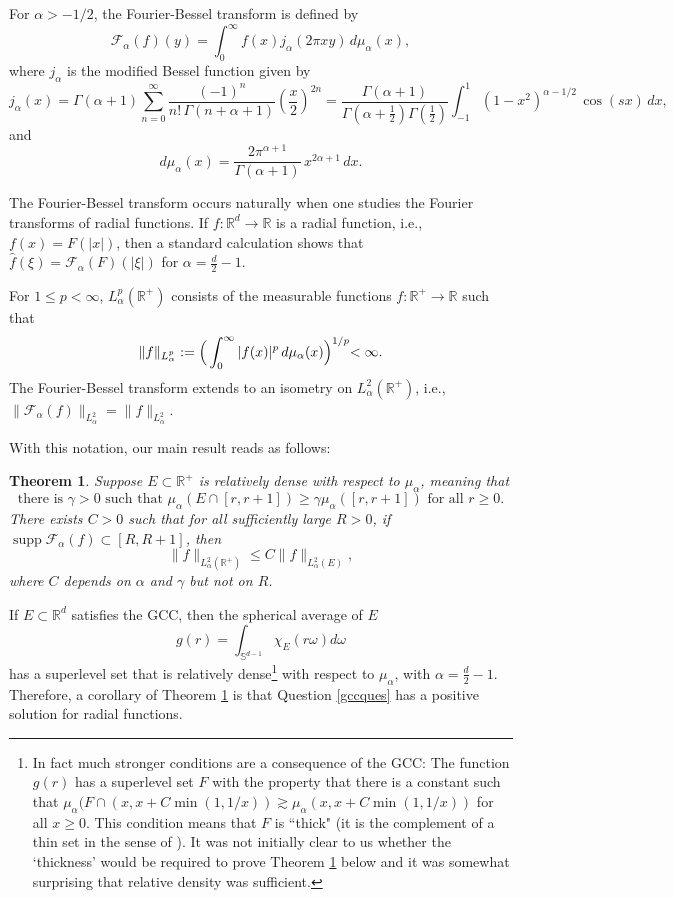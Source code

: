 \documentclass[11pt,a4paper,reqno,dvipsnames]{amsart}
\newcommand{\supp}{\operatorname{supp}}
\newcommand{\F}{\mathcal{F}}
\newcommand{\R}{\mathbb R}
\renewcommand{\ge}{\geqslant}
\renewcommand{\le}{\leqslant}
\numberwithin{equation}{section}
\theoremstyle{plain}
\newtheorem{theorem}[equation]{Theorem}
\theoremstyle{definition}
\theoremstyle{remark}
\begin{document}
For $\alpha > -1/2$, the Fourier-Bessel transform is defined by $$\mathcal F_\alpha(f)(y) = \int_0^\infty f(x) j_\alpha(2\pi xy)\, d\mu_\alpha(x),$$
      where $j_\alpha$ is the modified Bessel function given by $$j_\alpha(x) = \Gamma(\alpha + 1) \sum_{n=0}^\infty \frac{(-1)^n}{n!\, \Gamma(n + \alpha + 1)} \left(\frac{x}{2}\right)^{2n} = \frac{\Gamma(\alpha + 1)}{\Gamma\left(\alpha + \frac12\right) \Gamma\left(\frac12\right)} \int_{-1}^1 (1-x^2)^{\alpha - 1/2}\, \cos(sx)\, dx,$$
      and
      $$d\mu_\alpha(x) = \frac{2\pi^{\alpha + 1}}{\Gamma(\alpha + 1)}\, x^{2\alpha+1}\, dx.$$

The Fourier-Bessel transform occurs naturally when one studies the Fourier transforms of radial functions. If $f: \R^d \to \R$ is a radial function, i.e., $f(x) = F(|x|)$, then a standard calculation shows that $\widehat{f}(\xi) = \F_\alpha (F)(|\xi|)$ for $\alpha = \frac{d}{2} - 1$.
      
      For $1\leqslant p < \infty$, $L^p_\alpha(\R^+)$ consists of the measurable functions $f:\R^+ \to \R$ such that
      $$\|f\|_{L^p_\alpha} := \Bigl(\,\int_0^\infty |f(x)|^p\, d\mu_\alpha(x) \Bigl)^{1/p}<\infty.$$
      The Fourier-Bessel transform extends to an isometry on $L^2_\alpha(\R^+)$, i.e., $\|\mathcal{F}_\alpha(f)\|_{L^2_\alpha} = \|f\|_{L^2_\alpha}$.

With this notation, our main result reads as follows:

      \begin{tcolorbox}[colback=SeaGreen!10, colframe=SeaGreen!80, boxrule=0.5mm, left=2mm, right=2mm, boxsep=1mm, arc=1mm.]
\begin{theorem}
\label{thm1}
    Suppose $E\subset\R^+$ is relatively dense with respect to $\mu_{\alpha}$, meaning that
$$\text{there is }\gamma>0 \text{ such that }\mu_\alpha(E\cap [r,r+1]) \ge \gamma \mu_\alpha([r,r+1]) \text{ for all }r\ge 0.$$ 
There exists $C>0$ such that for all sufficiently large $R > 0$, if $\supp \F_\alpha(f) \subset [R,R+1]$, then 
$$\|f\|_{L^2_\alpha(\R^+)} \le C\|f\|_{L^2_\alpha(E)},$$
where $C$ depends on $\alpha$ and $\gamma$ but not on $R$.
\end{theorem}
\end{tcolorbox}

If $E\subset \R^d $ satisfies the GCC, then the spherical average of $E$  
$$g(r) = \int_{\mathbb{S}^{d-1}}\chi_E(r\omega)d\omega$$
has a superlevel set that is relatively dense\footnote{In fact much stronger conditions are a consequence of the GCC:  The function $g(r)$ has a superlevel set $F$ with the property that there is a constant such that $\mu_{\alpha}(F\cap(x, x+C\min(1,1/x))\gtrsim \mu_{\alpha}(x,x+C\min(1,1/x))$ for all $x\geq 0$.  This condition means that $F$ is ``thick" (it is the complement of a thin set in the sense of \cite{shubin98}).  It was not initially clear to us whether the `thickness' would be required to prove Theorem \ref{thm1} below and it was somewhat surprising that relative density was sufficient.}  with respect to $\mu_{\alpha}$, with $\alpha = \frac{d}{2}-1$.  Therefore, a corollary of Theorem \ref{thm1} is that Question \ref{gccques} has a positive solution for radial functions. 
\end{document}
